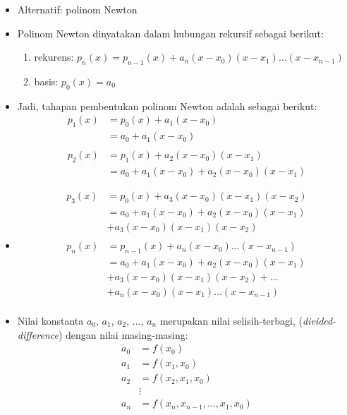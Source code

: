 \documentclass[pdflatex,compress,mathserif]{beamer}
\begin{document}
\begin{frame}
	\begin{itemize}
		\item Alternatif: polinom Newton
		\item Polinom Newton dinyatakan dalam hubungan rekursif sebagai berikut:
		\begin{enumerate}
			\item rekurens: $ p_n(x) = p_{n-1}(x) + a_n(x - x_0)(x - x_1) \dots (x - x_{n-1} ) $
			\item basis: $ p_0(x) = a_0 $
		\end{enumerate}
		\item Jadi, tahapan pembentukan polinom Newton adalah sebagai berikut:
		\begin{align*}
			p_1(x) &= p_0(x) + a_1 (x - x_0) \\
			&= a_0 + a_1 (x - x_0)\\
			&\\
			p_2(x) &= p_1(x) + a_2 (x - x_0)(x - x_1) \\
			&= a_0 + a_1 (x - x_0) + a_2 (x - x_0)(x - x_1)
		\end{align*}
	\end{itemize}
\end{frame}

\begin{frame}
	\begin{itemize}
		\item[]
		\begin{align*}
			p_3(x) &= p_0(x) + a_3 (x - x_0)(x - x_1)(x - x_2) \\
			&= a_0 + a_1 (x - x_0) + a_2 (x - x_0)(x - x_1)\\
			&+ a_3 (x - x_0)(x - x_1)(x - x_2)\\
			&\\
			p_n(x) &= p_{n-1}(x) + a_n (x - x_0)\dots(x - x_{n-1})\\
			&= a_0 + a_1 (x - x_0) + a_2 (x - x_0)(x - x_1)\\
			&+ a_3 (x - x_0)(x - x_1)(x - x_2) + \dots \\
			&+  a_n (x - x_0)(x - x_1)\dots(x - x_{n-1})\\
		\end{align*}
	\end{itemize}
\end{frame}

\begin{frame}
	\begin{itemize}
		\item Nilai konstanta $ a_0 $, $ a_1 $, $ a_2 $, $\dots$, $ a_n $ merupakan nilai selisih-terbagi, (\textit{divided-difference}) dengan nilai masing-masing:
		\begin{align*}
		a_0 &= f(x_0) \\
		a_1 &= f(x_1,x_0) \\
		a_2 &= f(x_2,x_1,x_0) \\
		&\vdots\\
		a_n &= f(x_n, x_{n-1}, \dots, x_1, x_0) \\
		\end{align*}
	\end{itemize}
\end{frame}
\end{document}
